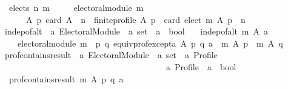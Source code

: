 \begin{isabellebody}
\ \ {\isachardoublequoteopen}elects\ n\ m\ {\isasymequiv}\isanewline
\ \ \ \ electoral{\isacharunderscore}{\kern0pt}module\ m\ {\isasymand}\isanewline
\ \ \ \ \ \ {\isacharparenleft}{\kern0pt}{\isasymforall}A\ p{\isachardot}{\kern0pt}\ {\isacharparenleft}{\kern0pt}card\ A\ {\isasymge}\ n\ {\isasymand}\ finite{\isacharunderscore}{\kern0pt}profile\ A\ p{\isacharparenright}{\kern0pt}\ {\isasymlongrightarrow}\ card\ {\isacharparenleft}{\kern0pt}elect\ m\ A\ p{\isacharparenright}{\kern0pt}\ {\isacharequal}{\kern0pt}\ n{\isacharparenright}{\kern0pt}{\isachardoublequoteclose}\isanewline
\isanewline
\isanewline
\isanewline
\isanewline
{}\isamarkupfalse%
\ indep{\isacharunderscore}{\kern0pt}of{\isacharunderscore}{\kern0pt}alt\ {\isacharcolon}{\kern0pt}{\isacharcolon}{\kern0pt}\ {\isachardoublequoteopen}{\isacharprime}{\kern0pt}a\ Electoral{\isacharunderscore}{\kern0pt}Module\ {\isasymRightarrow}\ {\isacharprime}{\kern0pt}a\ set\ {\isasymRightarrow}\ {\isacharprime}{\kern0pt}a\ {\isasymRightarrow}\ bool{\isachardoublequoteclose}\ \isanewline
\ \ {\isachardoublequoteopen}indep{\isacharunderscore}{\kern0pt}of{\isacharunderscore}{\kern0pt}alt\ m\ A\ a\ {\isasymequiv}\isanewline
\ \ \ \ electoral{\isacharunderscore}{\kern0pt}module\ m\ {\isasymand}\ {\isacharparenleft}{\kern0pt}{\isasymforall}p\ q{\isachardot}{\kern0pt}\ equiv{\isacharunderscore}{\kern0pt}prof{\isacharunderscore}{\kern0pt}except{\isacharunderscore}{\kern0pt}a\ A\ p\ q\ a\ {\isasymlongrightarrow}\ m\ A\ p\ {\isacharequal}{\kern0pt}\ m\ A\ q{\isacharparenright}{\kern0pt}{\isachardoublequoteclose}%
\isadelimdocument
%
\endisadelimdocument
%
\isatagdocument
%
\isamarkuptrue%
%
\endisatagdocument
{\isafolddocument}%
%
\isadelimdocument
%
\endisadelimdocument
{}\isamarkupfalse%
\ prof{\isacharunderscore}{\kern0pt}contains{\isacharunderscore}{\kern0pt}result\ {\isacharcolon}{\kern0pt}{\isacharcolon}{\kern0pt}\ {\isachardoublequoteopen}{\isacharprime}{\kern0pt}a\ Electoral{\isacharunderscore}{\kern0pt}Module\ {\isasymRightarrow}\ {\isacharprime}{\kern0pt}a\ set\ {\isasymRightarrow}\ {\isacharprime}{\kern0pt}a\ Profile\ {\isasymRightarrow}\isanewline
\ \ \ \ \ \ \ \ \ \ \ \ \ \ \ \ \ \ \ \ \ \ \ \ \ \ \ \ \ \ \ \ \ \ \ \ \ \ \ {\isacharprime}{\kern0pt}a\ Profile\ {\isasymRightarrow}\ {\isacharprime}{\kern0pt}a\ {\isasymRightarrow}\ bool{\isachardoublequoteclose}\ \isanewline
\ \ {\isachardoublequoteopen}prof{\isacharunderscore}{\kern0pt}contains{\isacharunderscore}{\kern0pt}result\ m\ A\ p\ q\ a\ {\isasymequiv}\isanewline

\end{isabellebody}
